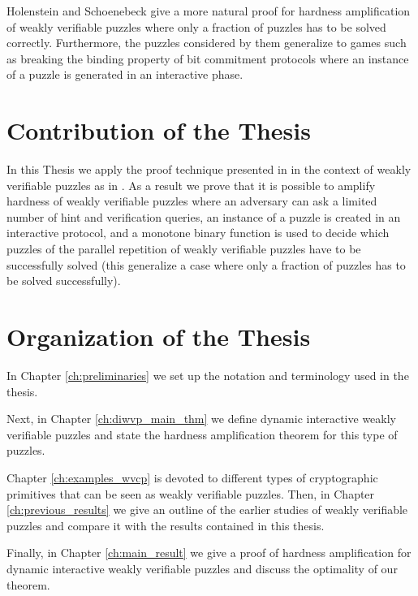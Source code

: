 Holenstein and Schoenebeck \cite{DBLP:journals/corr/abs-1002-3534} give a more natural proof for hardness amplification
of weakly verifiable puzzles where only a fraction of puzzles has to be solved correctly.
Furthermore, the puzzles considered by them generalize to games such as breaking the binding property of bit commitment protocols
where an instance of a puzzle is generated in an interactive phase.

\section{Contribution of the Thesis}
In this Thesis we apply the proof technique presented in \cite{DBLP:journals/corr/abs-1002-3534}
in the context of weakly verifiable puzzles as in \cite{Dodis:2009:SAI:1530441.1530450}.
As a result we prove that it is possible to amplify hardness of weakly verifiable puzzles where an adversary
can ask a limited number of hint and verification queries, an instance of a puzzle is created in an interactive protocol,
and a monotone binary function is used to decide which puzzles of the parallel repetition of weakly verifiable puzzles
have to be successfully solved (this generalize a case where only a fraction of puzzles has to be solved successfully).
%
\section{Organization of the Thesis}
In Chapter \ref{ch:preliminaries} we set up the notation and terminology used in the thesis.

Next, in Chapter \ref{ch:diwvp_main_thm} we define dynamic interactive weakly verifiable
puzzles and state the hardness amplification theorem for this type of puzzles.

Chapter \ref{ch:examples_wvcp} is devoted to different types of cryptographic primitives that
can be seen as weakly verifiable puzzles.
Then, in Chapter \ref{ch:previous_results} we give an outline of the earlier studies of weakly
verifiable puzzles and compare it with the results contained in this thesis.

Finally, in Chapter \ref{ch:main_result} we give a proof of hardness amplification for dynamic interactive weakly verifiable puzzles
and discuss the optimality of our theorem.


